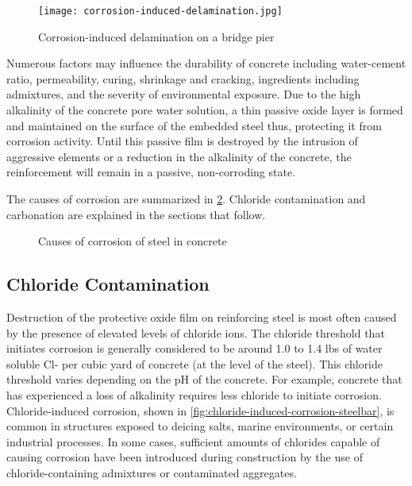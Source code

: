 \begin{figure}
  \texttt{[image: corrosion-induced-delamination.jpg]}
  \caption{Corrosion-induced delamination on a bridge pier}
  \label{fig:corrosion-induced-delamination}
\end{figure}

Numerous factors may influence the durability of concrete including water-cement ratio, permeability, curing, shrinkage and cracking, ingredients including admixtures, and the severity of environmental exposure. Due to the high alkalinity of the concrete pore water solution, a thin passive oxide layer is formed and maintained on the surface of the embedded steel thus, protecting it from corrosion activity. Until this passive film is destroyed by the intrusion of aggressive elements or a reduction in the alkalinity of the concrete, the reinforcement will remain in a passive, non-corroding state.

The causes of corrosion are summarized in \cref{fig:causes-of-corrosion-steelbar}. Chloride contamination and carbonation are explained in the sections that follow.

\begin{figure}
  \caption{Causes of corrosion of steel in concrete}
  \label{fig:causes-of-corrosion-steelbar}
\end{figure}


\subsection{Chloride Contamination}
Destruction of the protective oxide film on reinforcing steel is most often caused by the presence of elevated
levels of chloride ions. The chloride threshold that initiates corrosion is generally considered to be around 1.0 to 1.4
lbs of water soluble Cl- per cubic yard of concrete (at the level of the steel). This chloride threshold varies depending
on the pH of the concrete. For example, concrete that has experienced a loss of alkalinity requires less chloride to
initiate corrosion. Chloride-induced corrosion, shown in \cref{fig:chloride-induced-corrosion-steelbar}, is common in structures exposed to deicing salts,
marine environments, or certain industrial processes. In some cases, sufficient amounts of chlorides capable of
causing corrosion have been introduced during construction by the use of chloride-containing admixtures or
contaminated aggregates.

